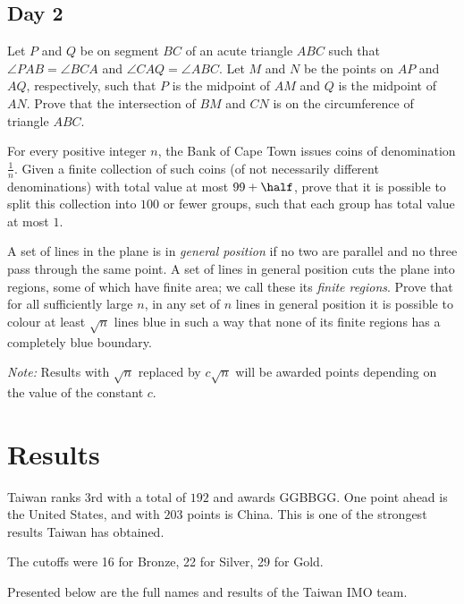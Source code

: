 \documentclass[11pt]{scrreprt}
\numberwithin{figure}{chapter}
\begin{document}
\section{Day 2}
\begin{problem}
  Let $P$ and $Q$ be on segment $BC$ of an acute triangle $ABC$ such that $\angle PAB=\angle BCA$ and $\angle CAQ=\angle ABC$. Let $M$ and $N$ be the points on $AP$ and $AQ$, respectively, such that $P$ is the midpoint of $AM$ and $Q$ is the midpoint of $AN$. Prove that the intersection of $BM$ and $CN$ is on the circumference of triangle $ABC$.
\end{problem}
\begin{problem}
  For every positive integer $n$, the Bank of Cape Town issues coins of denomination $\frac 1n$.
  Given a finite collection of such coins (of not necessarily different denominations) with total value at most $99 + \half$, prove that it is possible to split this collection into $100$ or fewer groups, such that each group has total value at most $1$.
\end{problem}
\begin{problem}
  A set of lines in the plane is in \emph{general position} if no two are parallel and no three pass through the same point. A set of lines in general position cuts the plane into regions, some of which have finite area; we call these its \emph{finite regions}.
  Prove that for all sufficiently large $n$, in any set of $n$ lines in general position it is possible to colour at least $\sqrt{n}$ lines blue in such a way that none of its finite regions has a completely blue boundary.

  \emph{Note:} Results with $\sqrt{n}$ replaced by $c\sqrt{n}$ will be awarded points depending on the value of the constant $c$.
\end{problem}


\chapter{Results}
Taiwan ranks $3$rd with a total of $192$ and awards GGBBGG.
One point ahead is the United States, and with $203$ points is China.
This is one of the strongest results Taiwan has obtained.

The cutoffs were 16 for Bronze, 22 for Silver, 29 for Gold.

Presented below are the full names and results of the Taiwan IMO team.
\end{document}
